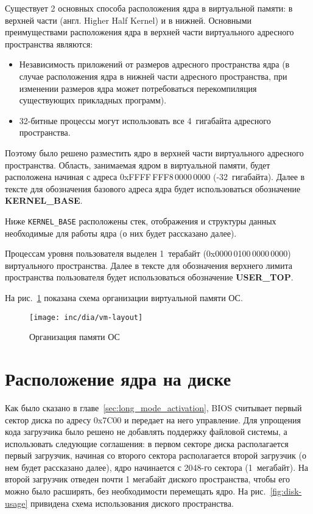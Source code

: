 Существует 2 основных способа расположения ядра в виртуальной памяти: в верхней части (англ. Higher Half Kernel)
и в нижней. Основными преимуществами расположения ядра в верхней части виртуального адресного пространства являются:
\begin{itemize}
\item Независимость приложений от размеров адресного пространства ядра (в случае расположения ядра в нижней части
	адресного пространства, при изменении размеров ядра может потребоваться перекомпиляция существующих
	прикладных программ).
\item 32-битные процессы могут использовать все 4~гигабайта адресного пространства.
\end{itemize}

Поэтому было решено разместить ядро в верхней части виртуального адресного пространства. Область, занимаемая
ядром в виртуальной памяти, будет расположена начиная с адреса 0xFFFF\,FFF8\,0000\,0000 (-32~гигабайта). Далее
в тексте для обозначения базового адреса ядра будет использоваться обозначение \textbf{KERNEL\_BASE}.

Ниже \texttt{KERNEL\_BASE} расположены стек, отображения и структуры данных необходимые для
работы ядра (о них будет рассказано далее).

Процессам уровня пользователя выделен 1~терабайт (0x0000\,0100\,0000\,0000) виртуального пространства.
Далее в тексте для обозначения верхнего лимита пространства пользователя будет использоваться
обозначение \textbf{USER\_TOP}.

На рис.~\ref{fig:vm-layout} показана схема организации виртуальной памяти ОС.
\begin{figure}[ht!]
  \centering
  \texttt{[image: inc/dia/vm-layout]}
  \caption{Организация памяти ОС}
  \label{fig:vm-layout}
\end{figure}

\section{Расположение ядра на диске}
Как было сказано в главе~\ref{sec:long_mode_activation}, BIOS считывает первый сектор диска
по адресу 0x7C00 и передает на него управление. Для упрощения кода загрузчика было решено не
добавлять поддержку файловой системы, а использовать следующие соглашения: в первом секторе
диска располагается первый
загрузчик, начиная со второго сектора располагается второй загрузчик (о нем будет рассказано
далее), ядро начинается с 2048-го сектора (1~мегабайт). На второй загрузчик отведен почти
1 мегабайт диского пространства, чтобы его можно было расширять, без необходимости перемещать
ядро. На рис.~\ref{fig:disk-usage} привидена схема использования диского пространства.

